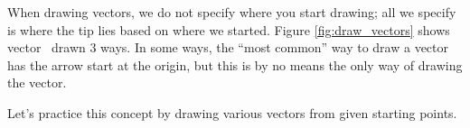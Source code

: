 
\enlargethispage{2\baselineskip}

\begin{myfigure}
\begin{center}
\end{center}
\label{fig:draw_vectors}
\end{myfigure}

When drawing vectors, we do not specify where you start drawing; all we specify is where the tip lies based on where we started. Figure \ref{fig:draw_vectors} shows vector \vx\ drawn 3 ways. In some ways, the ``most common'' way to draw a vector has the arrow start at the origin,%
 but this is by no means the only way of drawing the vector.

Let's practice this concept by drawing various vectors from given starting points.\\

